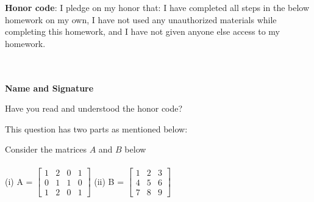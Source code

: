 \documentclass[solution,addpoints,12pt]{exam}
\begin{document}
\noindent \textbf{Honor code}: I pledge on my honor that: I have completed all steps in the below homework on my own, I have not used any unauthorized materials while completing this homework, and I have not given anyone else access to my homework.
\\~\\~\\
\begin{flushright}
\textbf{Name and Signature}

\end{flushright}


\begin{questions}

\question[1] Have you read and understood the honor code?
\begin{solution}

\end{solution}



\question[2] This question has two parts as mentioned below:


\question[2] Consider the matrices $A$ and $B$ below\\
\\
(i) A = $
\begin{bmatrix}
1 & 2 & 0 & 1 \\
0 & 1 & 1 & 0 \\
1 & 2 & 0 & 1 
\end{bmatrix}
$
(ii) B = $
\begin{bmatrix}
1 & 2 & 3 \\
4 & 5 & 6 \\
7 & 8 & 9
\end{bmatrix}
$
\\
\begin{parts}

\end{parts}
\end{questions}
\end{document}
